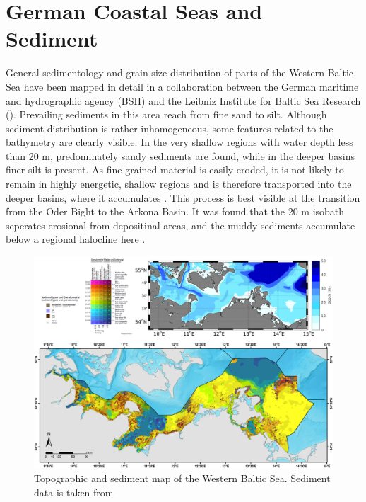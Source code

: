 \section{German Coastal Seas and Sediment}

General sedimentology and grain size distribution of parts of the Western 
Baltic Sea have 
been mapped in detail in a collaboration between the German maritime and 
hydrographic agency (BSH) and the Leibniz Institute for Baltic Sea Research 
(). Prevailing sediments in this area reach from 
fine sand to silt. Although sediment distribution is rather inhomogeneous, some 
features related to the bathymetry are clearly visible. In the very shallow 
regions with water depth less than 20 m, predominately sandy sediments are 
found, while in the deeper basins finer silt is present.
As fine grained material is easily eroded, it is not likely to remain in highly 
energetic, shallow regions and is therefore transported into the deeper basins, 
where 
it accumulates \citep[][]{basys1}. This process is best visible at the 
transition from the Oder Bight to the Arkona Basin. It was found that the 20 m 
isobath seperates erosional from depositinal areas, and the muddy sediments 
accumulate below a regional halocline here \citep[][]{basys2}.

\begin{figure}[ht]
 \flushleft
 \includegraphics[width=15cm]{bilder/sediment.pdf}
 \caption{Topographic and sediment map of the Western Baltic 
Sea. Sediment data is taken from \citep[][]{tauber2012}}\label{westernbaltic}
\end{figure}